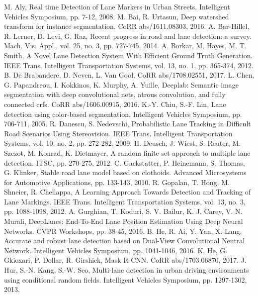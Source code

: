 \documentclass[letterpaper, 10 pt, conference]{ieeeconf}
\begin{document}
\begin{thebibliography}{99}

 M. Aly, Real time Detection of Lane Markers in Urban Streets. Intelligent Vehicles Symposium, pp. 7-12, 2008.
 M. Bai, R. Urtasun, Deep  watershed  transform  for instance  segmentation. CoRR abs/1611.08303, 2016.
 A. Bar-Hillel, R. Lerner, D. Levi, G. Raz, Recent progress in road and lane detection: a survey. Mach. Vis. Appl., vol. 25, no. 3, pp. 727-745, 2014.
 A. Borkar, M. Hayes, M. T. Smith, A Novel Lane Detection System With Efficient Ground Truth Generation. IEEE Trans. Intelligent Transportation Systems, vol. 13, no. 1, pp. 365-374, 2012.
 B. De Brabandere, D. Neven, L. Van Gool. CoRR abs/1708.02551, 2017.
 L. Chen, G. Papandreou, I. Kokkinos, K. Murphy, A. Yuille, Deeplab: Semantic image segmentation with deep convolutional nets, atrous convolution, and fully connected crfs. CoRR abs/1606.00915, 2016.
 K.-Y. Chiu, S.-F. Lin, Lane detection using color-based segmentation. Intelligent Vehicles Symposium, pp. 706-711, 2005.
 R. Danescu, S. Nedevschi, Probabilistic Lane Tracking in Difficult Road Scenarios Using Stereovision. IEEE Trans. Intelligent Transportation Systems, vol. 10, no. 2, pp. 272-282, 2009.
 H. Deusch, J. Wiest, S. Reuter, M. Szczot, M. Konrad, K. Dietmayer, A random finite set approach to multiple lane detection. ITSC, pp. 270-275, 2012.
 C. Gackstatter, P. Heinemann, S. Thomas, G. Klinker, Stable road lane model based on clothoids. Advanced Microsystems for Automotive Applications, pp. 133-143, 2010.
 R. Gopalan, T. Hong, M. Shneier, R. Chellappa, A Learning Approach Towards Detection and Tracking of Lane Markings. IEEE Trans. Intelligent Transportation Systems, vol. 13, no. 3, pp. 1088-1098, 2012.
 A. Gurghian, T. Koduri, S. V. Bailur, K. J. Carey, V. N. Murali, DeepLanes: End-To-End Lane Position Estimation Using Deep Neural Networks. CVPR Workshops, pp. 38-45, 2016.
 B. He, R. Ai, Y. Yan, X. Lang, Accurate and robust lane detection based on Dual-View Convolutional Neutral Network. Intelligent Vehicles Symposium, pp. 1041-1046, 2016.
 K. He, G. Gkioxari, P. Dollar, R. Girshick, Mask R-CNN. CoRR abs/1703.06870, 2017.
 J. Hur, S.-N. Kang, S.-W. Seo, Multi-lane detection in urban driving environments using conditional random fields. Intelligent Vehicles Symposium, pp. 1297-1302, 2013.

\end{thebibliography}
\end{document}
